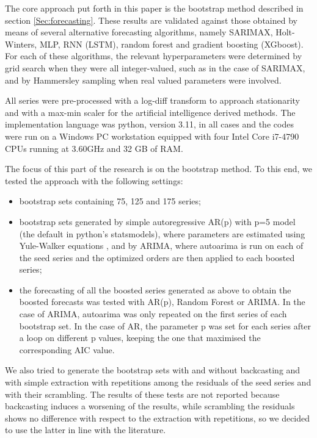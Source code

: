 \documentclass[ijoc,sglanonrev]{informs4}
\begin{document}
The core approach put forth in this paper is the bootstrap method described in section \ref{Sec:forecasting}. These results are validated against those obtained by means of several alternative forecasting algorithms, namely SARIMAX, Holt-Winters, MLP, RNN (LSTM), random forest and gradient boosting (XGboost). For each of these algorithms, the relevant hyperparameters were determined by grid search when they were all integer-valued, such as in the case of SARIMAX, and by Hammersley sampling \citep{H60} when real valued parameters were involved. 

All series were pre-processed with a log-diff transform to approach stationarity and with a max-min scaler for the artificial intelligence derived methods. The implementation language was python, version 3.11, in all cases and the codes were run on a Windows PC workstation equipped with four Intel Core i7-4790 CPUs running at 3.60GHz and 32 GB of RAM.

The focus of this part of the research is on the bootstrap method. To this end, we tested the approach with the following settings:
\begin{itemize}
\item bootstrap sets containing 75, 125 and 175 series;
\item bootstrap sets generated by simple autoregressive AR(p) with p=5 model (the default in python's statsmodels), where parameters are estimated using Yule-Walker equations \citep{BD91}, and by ARIMA, where autoarima is run on each of the seed series and the optimized orders are then applied to each boosted series;
\item the forecasting of all the boosted series generated as above to obtain the boosted forecasts was tested with AR(p), Random Forest or ARIMA. In the case of ARIMA, autoarima was only repeated on the first series of each bootstrap set. In the case of AR, the parameter p was set for each series after a loop on different p values, keeping the one that maximised the corresponding AIC value.
\end{itemize}

We also tried to generate the bootstrap sets with and without backcasting and with simple extraction with repetitions among the residuals of the seed series and with their scrambling. The results of these tests are not reported because backcasting induces a worsening of the results, while scrambling the residuals shows no difference with respect to the extraction with repetitions, so we decided to use the latter in line with the literature.
\end{document}
